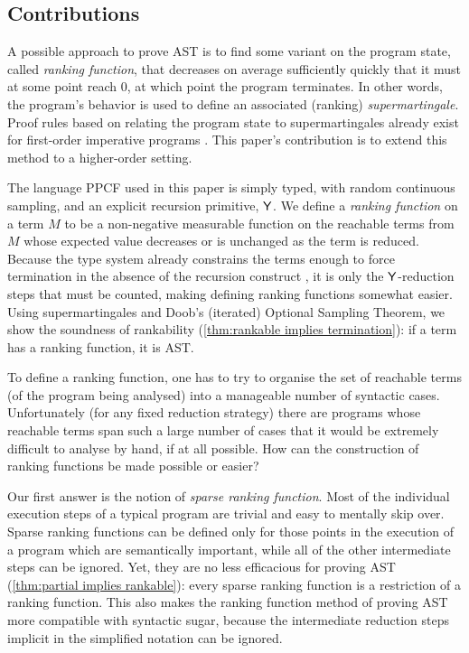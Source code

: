 \subsection*{Contributions}

A possible approach to prove AST is to find some variant on the program state, called \emph{ranking function}, that decreases on average sufficiently quickly that it must at some point reach 0, at which point the program terminates. 
In other words, the program's behavior is used to define an associated (ranking) \emph{supermartingale}. Proof rules based on relating the program state to supermartingales already exist for first-order imperative programs \cite{DBLP:conf/cav/ChakarovS13,DBLP:conf/popl/FioritiH15,DBLP:journals/pacmpl/McIverMKK18}. This paper's contribution is to extend this method to a higher-order setting.

The language PPCF used in this paper is simply typed, with random continuous sampling, and an explicit recursion primitive, $\mathsf{Y}$. 
We define a \emph{ranking function} on a term $M$ to be a non-negative measurable function on the reachable terms from $M$ whose expected value decreases or is unchanged as the term is reduced.
Because the type system already constrains the terms enough to force termination in the absence of the recursion construct \cite{tait1967,BarendregtDS2010}, it is only the $\mathsf{Y}$-reduction steps that must be counted, making defining ranking functions somewhat easier.
Using supermartingales and Doob's (iterated) Optional Sampling Theorem, we show the soundness of rankability (\cref{thm:rankable implies termination}): if a term has a ranking function, it is AST.

To define a ranking function, one has to try to organise the set of reachable terms (of the program being analysed) into a manageable number of syntactic cases. 
Unfortunately (for any fixed reduction strategy) there are programs whose reachable terms span such a large number of cases that it would be extremely difficult to analyse by hand, if at all possible. 
How can the construction of ranking functions be made possible or easier?

Our first answer is the notion of \emph{sparse ranking function}. 
Most of the individual execution steps of a typical program are trivial and easy to mentally skip over. Sparse ranking functions can be defined only for those points in the execution of a program which are semantically important, while all of the other intermediate steps can be ignored. Yet, they are no less efficacious for proving AST (\cref{thm:partial implies rankable}): every sparse ranking function is a restriction of a ranking function. This also makes the ranking function method of proving AST more compatible with syntactic sugar, because the intermediate reduction steps implicit in the simplified notation can be ignored.

